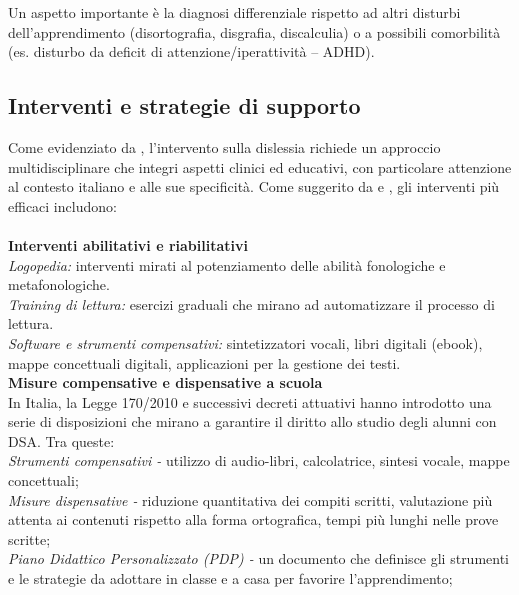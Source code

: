 \documentclass[14pt]{extbook}
\begin{document}
Un aspetto importante è la diagnosi differenziale rispetto ad altri disturbi dell’apprendimento (disortografia, disgrafia, discalculia) o a possibili comorbilità (es. disturbo da deficit di attenzione/iperattività – ADHD).\\

\subsection{Interventi e strategie di supporto}
Come evidenziato da \cite{masiero2017dsa}, l'intervento sulla dislessia richiede un approccio multidisciplinare che integri aspetti clinici ed educativi, con particolare attenzione al contesto italiano e alle sue specificità. Come suggerito da \cite{stella2011dislessia} e \cite{cornoldi2016linguaggio}, gli interventi più efficaci includono:\\\\

\textbf{Interventi abilitativi e riabilitativi}\\
\noindent \textit{Logopedia:} interventi mirati al potenziamento delle abilità fonologiche e metafonologiche.\\
\textit{Training di lettura:} esercizi graduali che mirano ad automatizzare il processo di lettura. \\
\textit{Software e strumenti compensativi:} sintetizzatori vocali, libri digitali (ebook), mappe concettuali digitali, applicazioni per la gestione dei testi.\\

\textbf{Misure compensative e dispensative a scuola}\\
In Italia, la Legge 170/2010 \cite{legge170} e successivi decreti attuativi hanno introdotto una serie di disposizioni che mirano a garantire il diritto allo studio degli alunni con DSA. Tra queste:\\

\textit{Strumenti compensativi -} utilizzo di audio-libri, calcolatrice, sintesi vocale, mappe concettuali;\\

\textit{Misure dispensative -} riduzione quantitativa dei compiti scritti, valutazione più attenta ai contenuti rispetto alla forma ortografica, tempi più lunghi nelle prove scritte;\\

\textit{Piano Didattico Personalizzato (PDP) -} un documento che definisce gli strumenti e le strategie da adottare in classe e a casa per favorire l’apprendimento;\\
\end{document}
